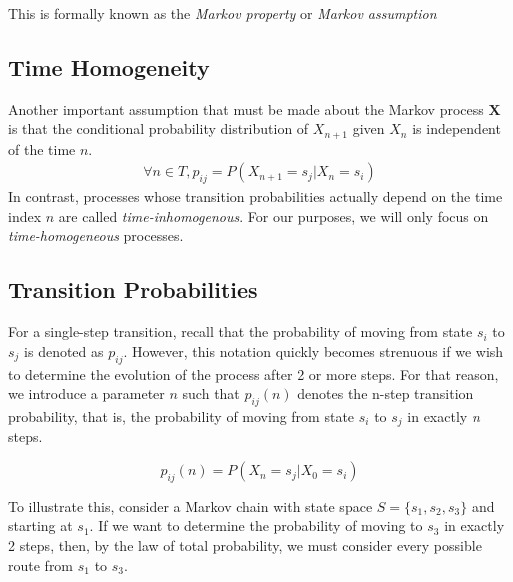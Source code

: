 \documentclass[a4paper, 12pt]{article}
\begin{document}
	This is formally known as the \emph{Markov property} or \emph{Markov assumption}
	
\subsection*{Time Homogeneity}
	
	Another important assumption that must be made about the Markov process $\mathbf{X}$ is that the conditional probability 
	distribution of $X_{n+1}$ given $X_n$ is independent of the time $n$.
	\begin{equation*}
		\begin{aligned}
			\forall n\in T, p_{ij} = P(X_{n+1} = s_j | X_{n} = s_i)
		\end{aligned}
	\end{equation*}
	In contrast, processes whose transition probabilities actually depend on the time index $n$ are called \emph{time-inhomogenous}.
	For our purposes, we will only focus on \emph{time-homogeneous} processes.
	
\subsection*{Transition Probabilities}
	
	For a single-step transition, recall that the probability of moving from state $s_i$ to $s_j$ is denoted as $p_{ij}$. 
	However, this notation quickly becomes strenuous if we wish to determine the evolution of the process after 2 or more
	 steps. For that reason, we introduce a parameter $n$ such that $p_{ij}(n)$ denotes the n-step transition 
	 probability, that is, the probability of moving from state $s_i$ to $s_j$ in exactly \emph{n} steps. 
		
	\[p_{ij}(n) = P(X_{n} = s_j | X_{0} = s_i)\]
	
	To illustrate this, consider a Markov chain with state space $S = \{s_1, s_2, s_3\}$ and starting at $s_1$. If we want 
	to determine the probability of moving to $s_3$ in exactly 2 steps, then, by the law of total probability, we must consider 
	every possible route from $s_1$ to $s_3$.
\end{document}
